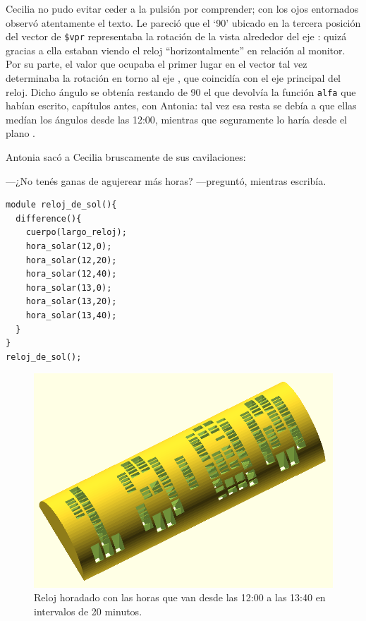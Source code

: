 Cecilia no pudo evitar ceder a la pulsión por comprender; con los ojos
entornados observó atentamente el texto. Le pareció que el `90'
ubicado en la tercera posición del vector de
\texttt{\$vpr} representaba la rotación de la vista alrededor del eje
: quizá gracias a ella estaban viendo el reloj
``horizontalmente'' en relación al monitor. Por su parte, el valor que
ocupaba el primer lugar en el vector tal vez determinaba la rotación
en torno al eje , que coincidía con el eje principal del
reloj. Dicho ángulo se obtenía restando de 90 el que devolvía la
función \lstinline!alfa! que habían escrito, capítulos antes, con
Antonia: tal vez esa resta se debía a que ellas medían los ángulos
desde las 12:00, mientras que \openscad{} seguramente lo haría desde
el plano .

Antonia sacó a Cecilia bruscamente de sus cavilaciones:

---¿No tenés ganas de agujerear más horas? ---preguntó, mientras
escribía.


\begin{lstlisting}
module reloj_de_sol(){
  difference(){
    cuerpo(largo_reloj);
    hora_solar(12,0);
    hora_solar(12,20);
    hora_solar(12,40);
    hora_solar(13,0);
    hora_solar(13,20);
    hora_solar(13,40);
  }
}
reloj_de_sol();
\end{lstlisting}%

\begin{figure}[ht]
  \centering
  \includegraphics[width=.97\textwidth]{imagenes/12_00_13_40}  
  \caption{Reloj horadado con las horas que van desde las 12:00 a las
    13:40 en intervalos de 20 minutos.}
  \label{fig:12_00_13_40}
\end{figure}

